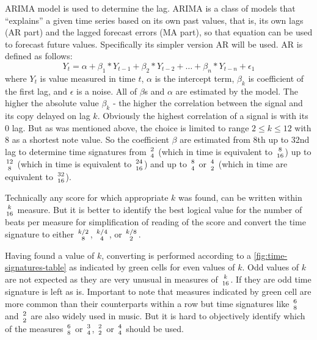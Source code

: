 \ac{ARIMA} model is used to determine the lag. \ac{ARIMA} is a class of models that ``explains'' a given time series
based on its own past values, that is, its own lags (AR part) and the lagged forecast errors (MA part), so that equation
can be used to forecast future values. Specifically its simpler version AR will be used. AR is defined as follows:
\[ Y_t = \alpha + \beta_1*Y_{t-1} + \beta_2*Y_{t-2} + \dots + \beta_n*Y_{t-n} + \epsilon_1 \]
where $Y_t$ is value measured in time $t$, $\alpha$ is the intercept term, $\beta_k$ is coefficient of the first lag,
and $\epsilon$ is a noise. All of $\beta$s and $\alpha$ are estimated by the model. The higher the absolute value
$\beta_k$ - the higher the correlation between the signal and its copy delayed on lag $k$. Obviously the highest
correlation of a signal is with its 0 lag. But as was mentioned above, the choice is limited to range $2 \le k \le 12$
with 8 as a shortest note value. So the coefficient $\beta$ are estimated from 8th up to 32nd lag to determine time
signatures from $2\atop4$ (which in time is equivalent to $8\atop16$) up to $12\atop8$ (which in time is equivalent to
$24\atop16$) and up to $8\atop4$ or $4\atop2$ (which in time are equivalent to $32\atop16$).

Technically any score for which appropriate $k$ was found, can be written within $k\atop16$ measure. But it is better to
identify the best logical value for the number of beats per measure for simplification of reading of the score and
convert the time signature to either $k/2\atop8$, $k/4\atop4$, or $k/8\atop2$.

Having found a value of $k$, converting is performed according to a \cref{fig:time-signatures-table} as indicated by
green cells for even values of $k$. Odd values of $k$ are not expected as they are very unusual in measures of
$k\atop16$. If they are odd time signature is left as is. Important to note that measures indicated by green cell are
more common than their counterparts within a row but time signatures like $6\atop8$ and $2\atop2$ are also widely used
in music. But it is hard to objectively identify which of the measures $6\atop8$ or $3\atop4$, $2\atop2$ or $4\atop4$
should be used.

